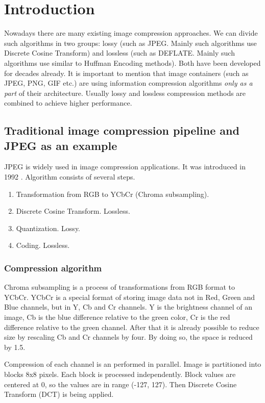 \chapter{Introduction}

Nowadays there are many existing image compression approaches. We can divide such algorithms in two groups: lossy (such as JPEG. Mainly such algorithms use Discrete Cosine Transform) and lossless (such as DEFLATE. Mainly such algorithms use similar to Huffman Encoding methods). Both have been developed for decades already. It is important to mention that image containers (such as JPEG, PNG, GIF etc.) are using information compression algorithms \textit{only as a part} of their architecture. Usually lossy and lossless compression methods are combined to achieve higher performance.

\section{Traditional image compression pipeline and JPEG as an example}

JPEG is widely used in image compression applications. It was introduced in 1992 \cite{wallace_jpeg_1992}. Algorithm consists of several steps.

\begin{enumerate}
    \item Transformation from RGB to YCbCr (Chroma subsampling).
    \item Discrete Cosine Transform. Lossless.
    \item Quantization. Lossy.
    \item Coding. Lossless.
\end{enumerate}

\subsection{Compression algorithm}

Chroma subsampling is a process of transformations from RGB format to YCbCr. YCbCr is a special format of storing image data not in Red, Green and Blue channels, but in Y, Cb and Cr channels. Y is the brightness channel of an image, Cb is the blue difference relative to the green color, Cr is the red difference relative to the green channel. After that it is already possible to reduce size by rescaling Cb and Cr channels by four. By doing so, the space is reduced by 1.5.

Compression of each channel is an performed in parallel. Image is partitioned into blocks 8x8 pixels. Each block is processed independently. Block values are centered at 0, so the values are in range (-127, 127). Then Discrete Cosine Transform (DCT) is being applied.

